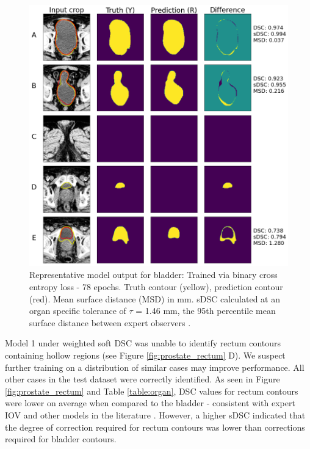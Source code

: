 \begin{figure}[H]
	\begin{center}
		\includegraphics[width=1.0\textwidth]{figures/prostate_BCE_bladder}
		\caption{Representative model output for bladder: Trained via binary cross entropy loss - 78 epochs. Truth contour (yellow), prediction contour (red). Mean surface distance (MSD) in mm. sDSC \cite{Nikolov_2018} calculated at an organ specific tolerance of $\tau$ = 1.46 mm, the 95th percentile mean surface distance between expert observers \cite{Roach_2019}.}
		\label{fig:prostate_BCE_bladder}
	\end{center}
\end{figure}

Model 1 under weighted soft DSC was unable to identify rectum contours containing hollow regions (see Figure \ref{fig:prostate_rectum} D). We suspect further training on a distribution of similar cases may improve performance. All other cases in the test dataset were correctly identified. As seen in Figure \ref{fig:prostate_rectum} and Table \ref{table:organ}, DSC values for rectum contours were lower on average when compared to the bladder - consistent with expert IOV \cite{CITATION} and other models in the literature \cite{CITATION}. However, a higher sDSC indicated that the degree of correction required for rectum contours was lower than corrections required for bladder contours.


